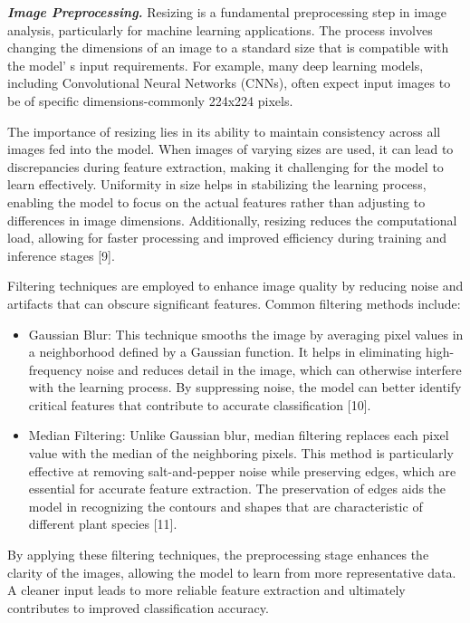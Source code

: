 {{\emph{{\bfseries Image Preprocessing.}} Resizing is a fundamental
preprocessing step in image analysis, particularly for machine learning
applications. The process involves changing the dimensions of an image
to a standard size that is compatible with the model' s
input requirements. For example, many deep learning models, including
Convolutional Neural Networks (CNNs), often expect input images to be of
specific dimensions-commonly 224x224 pixels.

The importance of resizing lies in its ability to maintain consistency
across all images fed into the model. When images of varying sizes are
used, it can lead to discrepancies during feature extraction, making it
challenging for the model to learn effectively. Uniformity in size helps
in stabilizing the learning process, enabling the model to focus on the
actual features rather than adjusting to differences in image
dimensions. Additionally, resizing reduces the computational load,
allowing for faster processing and improved efficiency during training
and inference stages {[}9{]}.

Filtering techniques are employed to enhance image quality by reducing
noise and artifacts that can obscure significant features. Common
filtering methods include:

\begin{itemize}
\item
  Gaussian Blur: This technique smooths the image by averaging pixel
  values in a neighborhood defined by a Gaussian function. It helps in
  eliminating high-frequency noise and reduces detail in the image,
  which can otherwise interfere with the learning process. By
  suppressing noise, the model can better identify critical features
  that contribute to accurate classification {[}10{]}.
\item
  Median Filtering: Unlike Gaussian blur, median filtering replaces each
  pixel value with the median of the neighboring pixels. This method is
  particularly effective at removing salt-and-pepper noise while
  preserving edges, which are essential for accurate feature extraction.
  The preservation of edges aids the model in recognizing the contours
  and shapes that are characteristic of different plant species
  {[}11{]}.
\end{itemize}

By applying these filtering techniques, the preprocessing stage enhances
the clarity of the images, allowing the model to learn from more
representative data. A cleaner input leads to more reliable feature
extraction and ultimately contributes to improved classification
accuracy.

}}
